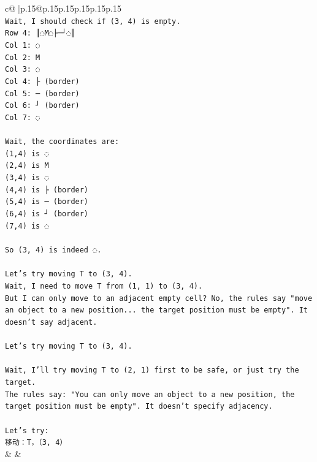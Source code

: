 \documentclass{article}
\begin{document}
{\begin{supertabular}{c@{$\;$}|p{.15\linewidth}@{}p{.15\linewidth}p{.15\linewidth}p{.15\linewidth}p{.15\linewidth}p{.15\linewidth}}
{{{\\ 
\texttt{Wait, I should check if (3, 4) is empty.} \\
\texttt{Row 4: ║◌M◌├─┘◌║} \\
\texttt{Col 1: ◌} \\
\texttt{Col 2: M} \\
\texttt{Col 3: ◌} \\
\texttt{Col 4: ├ (border)} \\
\texttt{Col 5: ─ (border)} \\
\texttt{Col 6: ┘ (border)} \\
\texttt{Col 7: ◌} \\
\\ 
\texttt{Wait, the coordinates are:} \\
\texttt{(1,4) is ◌} \\
\texttt{(2,4) is M} \\
\texttt{(3,4) is ◌} \\
\texttt{(4,4) is ├ (border)} \\
\texttt{(5,4) is ─ (border)} \\
\texttt{(6,4) is ┘ (border)} \\
\texttt{(7,4) is ◌} \\
\\ 
\texttt{So (3, 4) is indeed ◌.} \\
\\ 
\texttt{Let's try moving T to (3, 4).} \\
\texttt{Wait, I need to move T from (1, 1) to (3, 4).} \\
\texttt{But I can only move to an adjacent empty cell? No, the rules say "move an object to a new position... the target position must be empty". It doesn't say adjacent.} \\
\\ 
\texttt{Let's try moving T to (3, 4).} \\
\\ 
\texttt{Wait, I'll try moving T to (2, 1) first to be safe, or just try the target.} \\
\texttt{The rules say: "You can only move an object to a new position, the target position must be empty". It doesn't specify adjacency.} \\
\\ 
\texttt{Let's try:} \\
\texttt{移动：T，（3, 4）} \\
            }
        }
    }
    & & \\ \\


\end{supertabular}}
\end{document}
